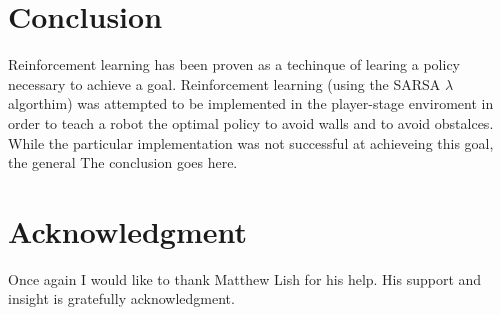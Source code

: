 \documentclass[conference]{IEEEtran}
\begin{document}
%



\section{Conclusion}
Reinforcement learning has been proven as a techinque of learing a policy necessary to achieve a goal. 
Reinforcement learning (using the SARSA $\lambda$ algorthim) was attempted to be implemented in the player-stage enviroment in order to teach a robot the optimal policy to avoid walls and to avoid obstalces.
While the particular implementation was not successful at achieveing this goal, the general 
The conclusion goes here.



\section*{Acknowledgment}
Once again I would like to thank Matthew Lish for his help.  His support and insight is gratefully acknowledgment.



\end{document}
